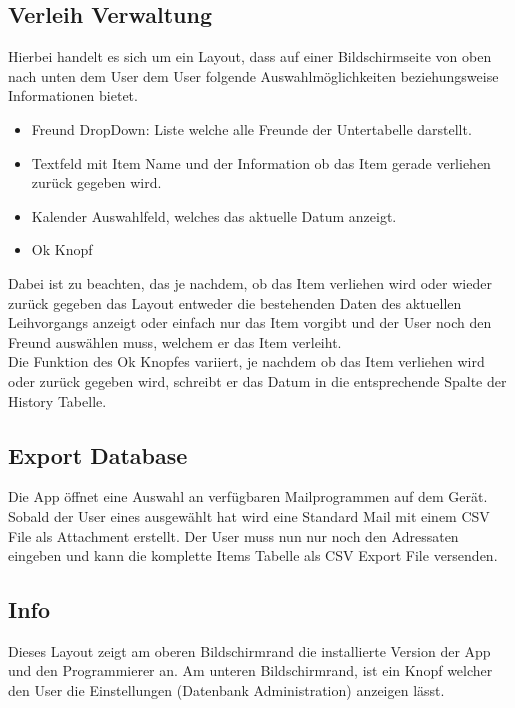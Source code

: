 \subsection{Verleih Verwaltung}

Hierbei handelt es sich um ein Layout, dass auf einer Bildschirmseite von oben nach unten dem User dem User folgende Auswahlmöglichkeiten beziehungsweise Informationen bietet.

\begin{itemize}
	\item Freund DropDown: Liste welche alle Freunde der Untertabelle darstellt.
	\item Textfeld mit Item Name und der Information ob das Item gerade verliehen zurück gegeben wird.
	\item Kalender Auswahlfeld, welches das aktuelle Datum anzeigt.
	\item Ok Knopf
\end{itemize}

Dabei ist zu beachten, das je nachdem, ob das Item verliehen wird oder wieder zurück gegeben das Layout entweder die bestehenden Daten des aktuellen Leihvorgangs anzeigt oder einfach nur das Item vorgibt und der User noch den Freund auswählen muss, welchem er das Item verleiht.\\

Die Funktion des Ok Knopfes variiert, je nachdem ob das Item verliehen wird oder zurück gegeben wird, schreibt er das Datum in die entsprechende Spalte der History Tabelle.

\subsection{Export Database}

Die App öffnet eine Auswahl an verfügbaren Mailprogrammen auf dem Gerät. Sobald der User eines ausgewählt hat wird eine Standard Mail mit einem CSV File als Attachment erstellt. Der User muss nun nur noch den Adressaten eingeben und kann die komplette Items Tabelle als CSV Export File versenden.

\subsection{Info}

Dieses Layout zeigt am oberen Bildschirmrand die installierte Version der App und den Programmierer an. Am unteren Bildschirmrand, ist ein Knopf welcher den User die Einstellungen (Datenbank Administration) anzeigen lässt. 

